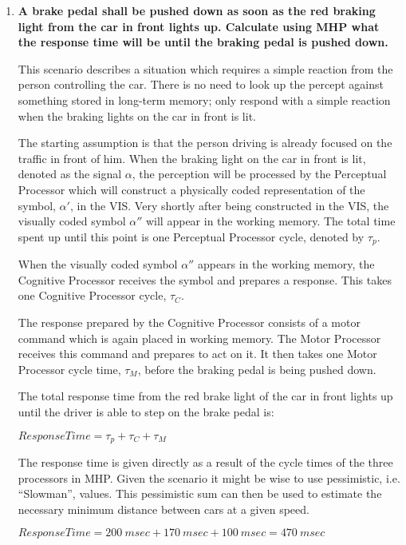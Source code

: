 \begin{enumerate}[label=\alph*)]

\item \textbf{A brake pedal shall be pushed down as soon as the red braking light from the car in front lights up. Calculate using \ac{MHP} what the response time will be until the braking pedal is pushed down.}

This scenario describes a situation which requires a simple reaction from the person controlling the car. There is no need to look up the percept against something stored in long-term memory; only respond with a simple reaction when the braking lights on the car in front is lit.

The starting assumption is that the person driving is already focused on the traffic in front of him. When the braking light on the car in front is lit, denoted as the signal $\alpha$, the perception will be processed by the Perceptual Processor which will construct a physically coded representation of the symbol, $\alpha '$, in the \ac{VIS}. Very shortly after being constructed in the \ac{VIS}, the visually coded symbol $\alpha''$ will appear in the working memory. The total time spent up until this point is one Perceptual Processor cycle, denoted by $\tau_p$.

When the visually coded symbol $\alpha''$ appears in the working memory, the Cognitive Processor receives the symbol and prepares a response. This takes one Cognitive Processor cycle, $\tau_C$.

The response prepared by the Cognitive Processor consists of a motor command which is again placed in working memory. The Motor Processor receives this command and prepares to act on it. It then takes one Motor Processor cycle time, $\tau_M$, before the braking pedal is being pushed down.

The total response time from the red brake light of the car in front lights up until the driver is able to step on the brake pedal is:

$\textit{ResponseTime} = \tau_p + \tau_C + \tau_M$

The response time is given directly as a result of the cycle times of the three processors in \ac{MHP}. Given the scenario it might be wise to use pessimistic, i.e. ``Slowman'', values. This pessimistic sum can then be used to estimate the necessary minimum distance between cars at a given speed.

$\textit{ResponseTime} = 200~\textit{msec} + 170~\textit{msec} + 100~\textit{msec} = 470~\textit{msec}$


\end{enumerate}
